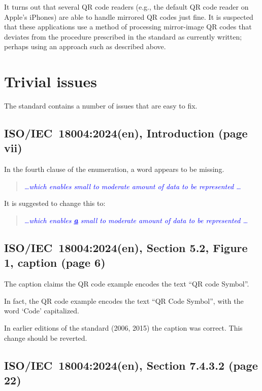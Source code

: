 \documentclass[a4paper,twoside]{article}
\newcommand{\shortstandard}{ISO/IEC~18004}
\newcommand{\standard}{\shortstandard:2024(en)}
\newcommand{\quotestandard}[1]{\textcolor{blue}{\textit{#1}}}
\newcommand{\ddd}{\dots}
\newcommand{\change}[1]{\underline{\textbf{#1}}}
\begin{document}
It turns out that several QR code readers (e.g., the default QR code reader on Apple's iPhones) are able to handle
mirrored QR codes just fine. It is suspected that these applications use a method of processing mirror-image QR
codes that deviates from the procedure prescribed in the standard as currently written; perhaps using an approach
such as described above.

\clearpage
\section{Trivial issues}
\label{sec:trivial-issues}

The standard contains a number of issues that are easy to fix.

\subsection{\standard, Introduction (page vii)}

In the fourth clause of the enumeration, a word appears to be missing.

\begin{quote}
\quotestandard{\ddd which enables small to moderate amount of data to be represented \ddd}
\end{quote}

It is suggested to change this to:

\begin{quote}
\quotestandard{\ddd which enables \change{a} small to moderate amount of data to be represented \ddd}
\end{quote}

\subsection{\standard, Section 5.2, Figure 1, caption (page 6)}

The caption claims the QR code example encodes the text ``QR code Symbol''.

In fact, the QR code example encodes the text ``QR Code Symbol'', with the word `Code' capitalized.

In earlier editions of the standard (2006, 2015) the caption was correct. This change should be reverted.

\subsection{\standard, Section 7.4.3.2 (page 22)}
\end{document}
